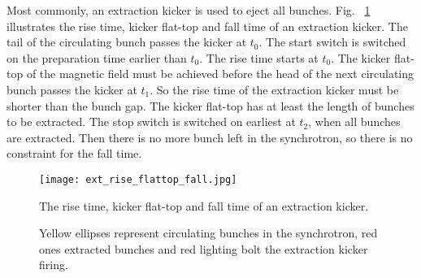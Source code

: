 %		  
%


Most commonly, an extraction kicker is used to eject all bunches. Fig. ~\ref{ext_rise_flattop_fall} illustrates the rise time, kicker flat-top and fall time of an extraction kicker. The tail of the circulating bunch passes the kicker at $t_0$. The start switch is switched on the preparation time earlier than $t_0$. The rise time starts at $t_0$. The kicker flat-top of the magnetic field must be achieved before the head of the next circulating bunch passes the kicker at $t_1$. So the rise time of the extraction kicker must be shorter than the bunch gap. The kicker flat-top has at least the length of bunches to be extracted. The stop switch is switched on earliest at $t_2$, when all bunches are extracted. Then there is no more bunch left in the synchrotron, so there is no constraint for the fall time. 

\begin{figure}[!htb]
   \centering   
   \texttt{[image: ext\_rise\_flattop\_fall.jpg]}
   \caption{The rise time, kicker flat-top and fall time of an extraction kicker.}
	\caption*{Yellow ellipses represent circulating bunches in the synchrotron, red ones extracted bunches and red lighting bolt the extraction kicker firing.}
   \label{ext_rise_flattop_fall}
\end{figure}
 
